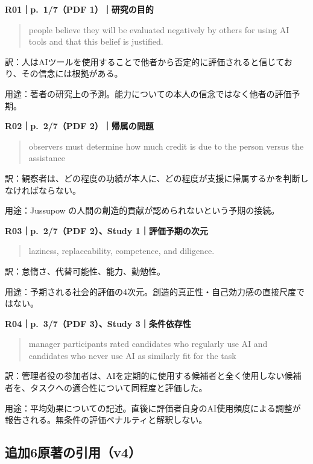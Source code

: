 \documentclass[
  11pt,
  a4paper,
]{article}
\begin{document}

\textbf{R01｜p.~1/7（PDF 1）｜研究の目的}

\begin{quote}
people believe they will be evaluated negatively by others for using AI
tools and that this belief is justified.
\end{quote}

訳：人はAIツールを使用することで他者から否定的に評価されると信じており、その信念には根拠がある。

用途：著者の研究上の予測。能力についての本人の信念ではなく他者の評価予期。


\textbf{R02｜p.~2/7（PDF 2）｜帰属の問題}

\begin{quote}
observers must determine how much credit is due to the person versus the
assistance
\end{quote}

訳：観察者は、どの程度の功績が本人に、どの程度が支援に帰属するかを判断しなければならない。

用途：Jussupow の人間の創造的貢献が認められないという予期の接続。


\textbf{R03｜p.~2/7（PDF 2）、Study 1｜評価予期の次元}

\begin{quote}
laziness, replaceability, competence, and diligence.
\end{quote}

訳：怠惰さ、代替可能性、能力、勤勉性。

用途：予期される社会的評価の4次元。創造的真正性・自己効力感の直接尺度ではない。


\textbf{R04｜p.~3/7（PDF 3）、Study 3｜条件依存性}

\begin{quote}
manager participants rated candidates who regularly use AI and
candidates who never use AI as similarly fit for the task
\end{quote}

訳：管理者役の参加者は、AIを定期的に使用する候補者と全く使用しない候補者を、タスクへの適合性について同程度と評価した。

用途：平均効果についての記述。直後に評価者自身のAI使用頻度による調整が報告される。無条件の評価ペナルティと解釈しない。

\subsection{追加6原著の引用（v4）}\label{ux8ffdux52a06ux539fux8457ux306eux5f15ux7528v4}
\end{document}
